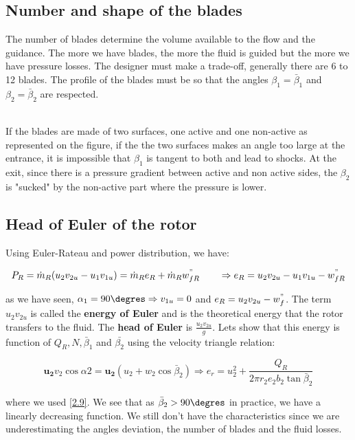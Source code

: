 \subsection{Number and shape of the blades}
The number of blades determine the volume available to the flow and the guidance. The more we have blades, the more the fluid is guided but the more we have pressure losses. The designer must make a trade-off, generally there are 6 to 12 blades. The profile of the blades must be so that the angles $\beta _1 = \bar{\beta}_1$ and $\beta _2 = \bar{\beta}_2$ are respected. 

\ \\
If the blades are made of two surfaces, one active and one non-active as represented on the figure, if the the two surfaces makes an angle too large at the entrance, it is impossible that $\beta _1$ is tangent to both and lead to shocks. At the exit, since there is a pressure gradient between active and non active sides, the $\beta _2$ is "sucked" by the non-active part where the pressure is lower. 

\subsection{Head of Euler of the rotor}
Using Euler-Rateau and power distribution, we have: 

\begin{equation}
P_R =  \dot{m}_R (u_2v_{2u}-u_1v_{1u}) = \dot{m}_R e_R + \dot{m}_R w^"_{fR} \qquad \Rightarrow e_R = u_2v_{2u}-u_1v_{1u} - w^"_{fR}
\end{equation}

as we have seen, $\alpha _1 = 90\degres \Rightarrow v_{1u} = 0$ and $e_R = u_2v_{2u} - w^"_f$. The term $u_2v_{2u}$ is called the \textbf{energy of Euler} and is the theoretical energy that the rotor transfers to the fluid. The \textbf{head of Euler} is $\frac{u_2v_{2u}}{g}$. Lets show that this energy is function of $Q_R, N, \bar{\beta}_1$ and $\bar{\beta _2}$ using the velocity triangle relation: 

\begin{equation}
\bm{u_2} v_2 \cos \alpha 2 = \bm{u_2}  (u_2 + w_2 \cos \bar{\beta} _2) \Rightarrow e_r = u^2_2 + \frac{Q_R}{2\pi r_2 e_2 b_2 \tan \bar{\beta} _2}
\end{equation}

where we used \autoref{2.9}. We see that as $\bar{\beta}_2>90\degres$ in practice, we have a linearly decreasing function. We still don't have the characteristics since we are underestimating the angles deviation, the number of blades and the fluid losses. 

